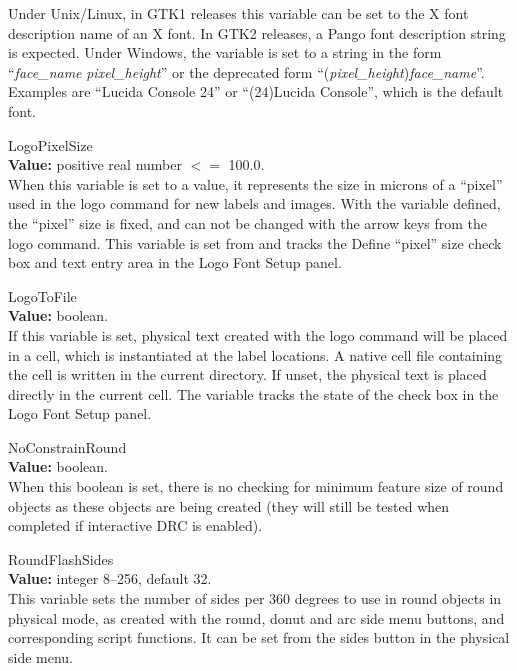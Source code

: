\begin{description}
Under Unix/Linux, in GTK1 releases this variable can be set to the X
font description name of an X font.  In GTK2 releases, a Pango font
description string is expected.  Under Windows, the variable is set to
a string in the form ``{\it face\_name} {\it pixel\_height\/}'' or the
deprecated form ``({\it pixel\_height\/}){\it face\_name\/}''. 
Examples are ``{\vt Lucida Console 24}'' or ``{\vt (24)Lucida
Console}'', which is the default font.

\item{\et LogoPixelSize}\\
{\bf Value:} positive real number $<=$ 100.0.\\
When this variable is set to a value, it represents the size in
microns of a ``pixel'' used in the {\cb logo} command for new labels
and images.  With the variable defined, the ``pixel'' size is fixed,
and can not be changed with the arrow keys from the {\cb logo}
command.  This variable is set from and tracks the {\cb Define
``pixel'' size} check box and text entry area in the {\cb Logo Font
Setup} panel.

\item{\et LogoToFile}\\
{\bf Value:} boolean.\\
If this variable is set, physical text created with the {\cb logo}
command will be placed in a cell, which is instantiated at the label
locations.  A native cell file containing the cell is written in the
current directory.  If unset, the physical text is placed directly in
the current cell.  The variable tracks the state of the check box in
the {\cb Logo Font Setup} panel.

\item{\et NoConstrainRound}\\
{\bf Value:} boolean.\\
When this boolean is set, there is no checking for minimum feature
size of round objects as these objects are being created (they will
still be tested when completed if interactive DRC is enabled).

\item{\et RoundFlashSides}\\
{\bf Value:} integer 8--256, default 32.\\
This variable sets the number of sides per 360 degrees to use in round
objects in physical mode, as created with the {\cb round}, {\cb donut}
and {\cb arc} side menu buttons, and corresponding script functions. 
It can be set from the {\cb sides} button in the physical side menu.


\end{description}
